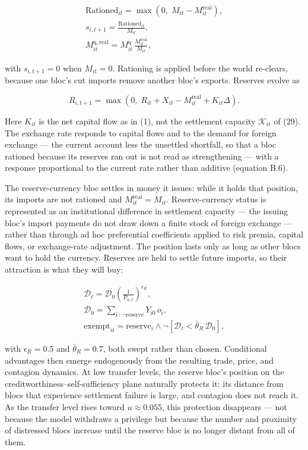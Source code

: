 \documentclass[preprint,review,12pt]{elsarticle}
\begin{document}
\[\begin{gathered} \mathrm{Rationed}_{it} = \max\left( 0,\; M_{it} - M^{\mathrm{real}}_{it} \right), \\ s_{i,t+1} = \frac{\mathrm{Rationed}_{it}}{M_{it}}, \\ M^{\mathrm{q,real}}_{it} = M^{\mathrm{q}}_{it} \, \frac{M^{\mathrm{real}}_{it}}{M_{it}}, \end{gathered} \tag{32}\]

with \(s_{i,t+1} = 0\) when \(M_{it} = 0\). Rationing is applied before
the world re-clears, because one bloc's cut imports remove another
bloc's exports. Reserves evolve as

\[R_{i,t+1} = \max\left( 0,\; R_{it} + X_{it} - M^{\mathrm{real}}_{it} + K_{it} \Delta \right). \tag{33}\]

Here \(K_{it}\) is the net capital flow as in (1), not the settlement
capacity \(\mathcal{K}_{it}\) of (29). The exchange rate responds to
capital flows and to the demand for foreign exchange --- the current account less the unsettled shortfall,
so that a bloc rationed because its reserves ran out is not read as
strengthening --- with a response proportional to the current rate
rather than additive (equation B.6).

The reserve-currency bloc settles in money it issues: while it holds
that position, its imports are not rationed and
\(M^{\mathrm{real}}_{it} = M_{it}\). Reserve-currency status is
represented as an institutional difference in settlement capacity ---
the issuing bloc's import payments do not draw down a finite stock of
foreign exchange --- rather than through ad hoc preferential
coefficients applied to risk premia, capital flows, or exchange-rate
adjustment. The position lasts only as long as other blocs want to hold
the currency. Reserves are held to settle future imports, so their
attraction is what they will buy:

\[\begin{gathered} \mathcal{D}_t = \mathcal{D}_0 \left( \frac{1}{P_{w,t}} \right)^{\epsilon_R}, \\ \mathcal{D}_0 = \sum_{i \,:\, \neg \mathrm{reserve}} Y_{i0} \, o_i, \\ \mathrm{exempt}_{it} = \mathrm{reserve}_i \wedge \neg\left[ \mathcal{D}_t < \bar{\theta}_R \, \mathcal{D}_0 \right], \end{gathered} \tag{34}\]

with \(\epsilon_R = 0.5\) and \(\bar{\theta}_R = 0.7\), both swept
rather than chosen. Conditional advantages then emerge endogenously from
the resulting trade, price, and contagion dynamics. At low transfer
levels, the reserve bloc's position on the
creditworthiness--self-sufficiency plane naturally protects it: its
distance from blocs that experience settlement failure is large, and
contagion does not reach it. As the transfer level rises toward
\(u \approx 0.055\), this protection disappears --- not because the
model withdraws a privilege but because the number and proximity of
distressed blocs increase until the reserve bloc is no longer distant
from all of them.
\end{document}
